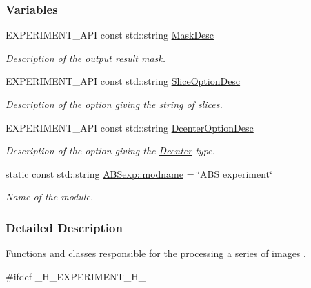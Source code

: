 \subsubsection*{Variables}
\begin{DoxyCompactItemize}
\item 
EXPERIMENT\_\-API const std::string \hyperlink{group__experiment_ga49fc44d3138ced27aa1b626e71399cef}{MaskDesc}
\begin{DoxyCompactList}\small\item\em Description of the output result mask. \item\end{DoxyCompactList}\item 
EXPERIMENT\_\-API const std::string \hyperlink{group__experiment_gab69c6d9d77c300fbbfcbde4a0c28eb14}{SliceOptionDesc}
\begin{DoxyCompactList}\small\item\em Description of the option giving the string of slices. \item\end{DoxyCompactList}\item 
EXPERIMENT\_\-API const std::string \hyperlink{group__experiment_gae4e896096ce7a0b4cbfbdd88b7e56286}{DcenterOptionDesc}
\begin{DoxyCompactList}\small\item\em Description of the option giving the \hyperlink{classDcenter}{Dcenter} type. \item\end{DoxyCompactList}\item 
static const std::string \hyperlink{group__experiment_gaabf3821c42c07421c350466c50fca270}{ABSexp::modname} = \char`\"{}ABS experiment\char`\"{}
\begin{DoxyCompactList}\small\item\em Name of the module. \item\end{DoxyCompactList}\end{DoxyCompactItemize}


\subsubsection{Detailed Description}
Functions and classes responsible for the processing a series of images .

\#ifdef \_\-H\_\-EXPERIMENT\_\-H\_\- 

